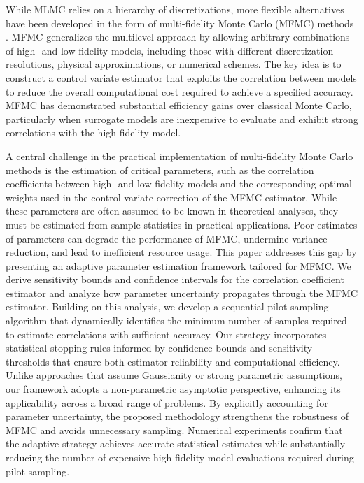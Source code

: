 While MLMC relies on a hierarchy of discretizations, more flexible alternatives have been developed in the form of multi-fidelity Monte Carlo (MFMC) methods \cite{PeWiGu:2016,PeGuWi:2018}. MFMC generalizes the multilevel approach by allowing arbitrary combinations of high- and low-fidelity models, including those with different discretization resolutions, physical approximations, or numerical schemes. The key idea is to construct a control variate estimator that exploits the correlation between models to reduce the overall computational cost required to achieve a specified accuracy. MFMC has demonstrated substantial efficiency gains over classical Monte Carlo, particularly when surrogate models are inexpensive to evaluate and exhibit strong correlations with the high-fidelity model.

A central challenge in the practical implementation of multi-fidelity Monte Carlo methods is the estimation of critical parameters, such as the correlation coefficients between high- and low-fidelity models and the corresponding optimal weights used in the control variate correction of the MFMC estimator. While these parameters are often assumed to be known in theoretical analyses, they must be estimated from sample statistics in practical applications. Poor estimates of parameters can degrade the performance of MFMC, undermine variance reduction, and lead to inefficient resource usage. This paper addresses this gap by presenting an adaptive parameter estimation framework tailored for MFMC. We derive sensitivity bounds and confidence intervals for the correlation coefficient estimator and analyze how parameter uncertainty propagates through the MFMC estimator. Building on this analysis, we develop a sequential pilot sampling algorithm that dynamically identifies the minimum number of samples required to estimate correlations with sufficient accuracy. Our strategy incorporates statistical stopping rules informed by confidence bounds and sensitivity thresholds that ensure both estimator reliability and computational efficiency. Unlike approaches that assume Gaussianity or strong parametric assumptions, our framework adopts a non-parametric asymptotic perspective, enhancing its applicability across a broad range of problems. By explicitly accounting for parameter uncertainty, the proposed methodology strengthens the robustness of MFMC and avoids unnecessary sampling. Numerical experiments confirm that the adaptive strategy achieves accurate statistical estimates while substantially reducing the number of expensive high-fidelity model evaluations required during pilot sampling.



